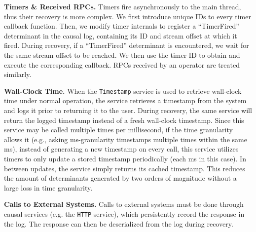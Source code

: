 \documentclass[sigconf]{acmart}
\newcommand{\para}[1]{\vspace{1mm}\noindent\textbf{#1.}}
\begin{document}
\para{Timers \& Received RPCs} Timers fire asynchronously to the main thread, thus their recovery is more complex. We first introduce unique IDs to every timer callback function. Then, we modify timer internals to register a ``TimerFired'' determinant in the causal log, containing its ID and stream offset at which it fired.
During recovery, if a ``TimerFired'' determinant is encountered, we wait for the same stream offset to be reached. We then use the timer ID to obtain and execute the corresponding callback. RPCs received by an operator are treated similarly.




\para{Wall-Clock Time} When the \texttt{Timestamp} service is used to retrieve wall-clock time under normal operation, the service retrieves a timestamp from the system and logs it prior to returning it to the user. During recovery, the same service will return the logged timestamp instead of a fresh wall-clock timestamp. Since this service may be called multiple times per millisecond, if the time granularity allows it (e.g., asking ms-granularity timestamps multiple times within the same ms), instead of generating a new timestamp on every call, this service utilizes timers to only update a stored timestamp periodically (each ms in this case). In between updates, the service simply returns its cached timestamp. This reduces the amount of determinants generated by two orders of magnitude without a large loss in time granularity.

\para{Calls to External Systems} Calls to external systems must be done through causal services (e.g. the \texttt{HTTP} service), which persistently record the response in the log. The response can then be deserialized from the log during recovery.
\end{document}
